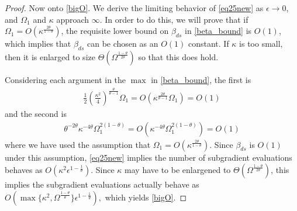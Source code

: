 \begin{proof}
Now onto \eqref{bigO}. We derive the limiting behavior of \eqref{eq25new} as $\epsilon\to 0$, and $\Omega_1$ and $\kappa$ approach $\infty$. 
In order to do this, we will prove that if $\Omega_1 = O(\kappa^{\frac{2\theta}{1-\theta}})$, the requisite lower bound on $\beta_{ds}$ in \eqref{beta_bound} is $O(1)$, which implies that $\beta_{ds}$ can be chosen as an $O(1)$ constant. 
 If $\kappa$ is too small, then it is enlarged to size $\Theta(\Omega^{\frac{1-\theta}{2\theta}})$ so that this does hold.
 
Considering each argument in the $\max$ in \eqref{beta_bound}, the first is
\begin{align*}
\frac{1}{2}
\left(\frac{\kappa^2}{4}\right)^{\frac{\theta}{\theta-1}}\Omega_1
=
O\left( 
\kappa^{\frac{2\theta}{\theta-1}}\Omega_1
\right) 
 =  O(1)
\end{align*}
and the second is
\begin{align*}
\theta^{-2\theta}\kappa^{-4\theta}\Omega_1^{2(1-\theta)}
=
O
\left(
\kappa^{-4\theta}\Omega_1^{2(1-\theta)}
\right)
 = O(1)
\end{align*}
where we have used the assumption that $\Omega_1 = O(\kappa^{\frac{2\theta}{1-\theta}})$.
Since $\beta_{ds}$ is $O(1)$ under this assumption, \eqref{eq25new} implies the number of subgradient evaluations behaves as 
$
O(\kappa^2\epsilon^{1-\frac{1}{\theta}}).
$
Since $\kappa$ may have to be enlargened to $\Theta(\Omega^{\frac{1-\theta}{2\theta}})$, this implies the subgradient evaluations actually behave as
$
O(\max\{\kappa^2,\Omega^{\frac{1-\theta}{\theta}}\}\epsilon^{1-\frac{1}{\theta}}), 
$
which yields \eqref{bigO}.



 
  

   \end{proof}
 